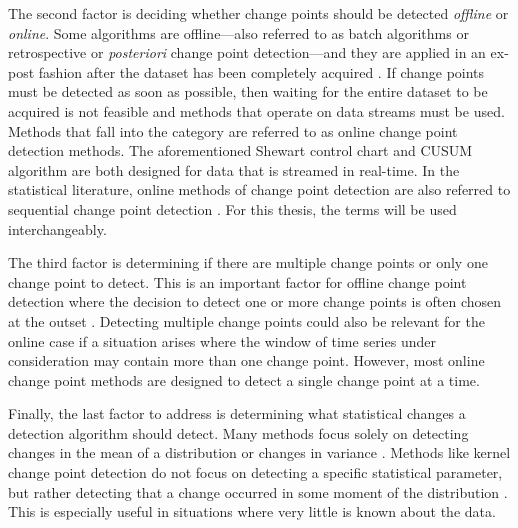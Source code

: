 The second factor is deciding whether change points should be detected \textit{offline} or \textit{online}. Some algorithms are offline---also referred to  as batch algorithms or retrospective or \textit{posteriori} change point detection---and they are applied in an ex-post fashion after the dataset has been completely acquired \cite{truong2020selective}. If change points must be detected as soon as possible, then waiting for the entire dataset to be acquired is not feasible and methods that operate on data streams must be used. Methods that fall into the category are referred to as online change point detection methods. The aforementioned Shewart control chart and CUSUM algorithm are both designed for data that is streamed in real-time. In the statistical literature, online methods of change point detection are also referred to sequential change point detection  \cite{tartakovsky2014sequential}. For this thesis, the terms will be used interchangeably.%


The third factor is determining if there are multiple change points or only one change point to detect. This is an important  factor for offline change point detection where the decision to detect one or more change points is often chosen at the outset \cite{jandhyala2013inference}.  Detecting multiple change points could also be relevant for the online case if a situation arises where the window of time series under consideration may contain more than one change point. However, most online change point methods are designed to detect a single change point at a time.

Finally, the last factor to address is determining what statistical changes a detection algorithm should detect. Many methods focus solely on detecting changes in the mean of a distribution \cite{lee2010change} or changes in variance \cite{hawkins2005change} \cite{inclan1994use}. Methods like kernel change point detection do not focus on detecting a specific statistical parameter, but rather detecting that a change occurred in some moment of the distribution \cite{arlot2019kernel}. This is especially useful in situations where very little is known about the data.

